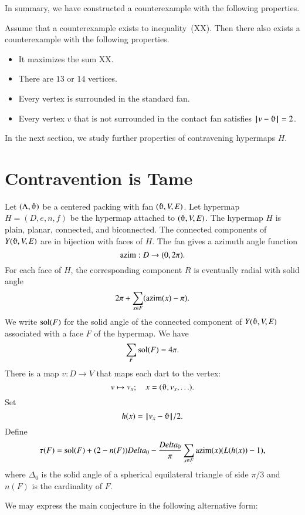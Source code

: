 In summary, we have constructed a counterexample with the following properties.

\begin{lemma} Assume that a counterexample exists to inequality~(XX).  Then there also exists a counterexample with the following properties.
\begin{itemize}
\item It maximizes the sum XX.
\item There are $13$ or $14$ vertices.
\item Every vertex is surrounded in the standard fan.
\item Every vertex $v$ that is not surrounded in the contact
fan satisfies $\norm{v}{\orgn}=2$.
\end{itemize}
\end{lemma}







In the next section, we study further properties of contravening hypermaps $H$.





\section{Contravention is Tame}
    \label{sec:contraproof}

Let $(\Lambda,\orgn)$ be a centered packing with
fan $(\orgn,V,E)$.  Let  hypermap $H=(D,e,n,f)$
be the hypermap attached to $(\orgn,V,E)$.
The hypermap $H$ is plain, planar, connected, and biconnected.
The connected components of $Y(\orgn,V,E)$ are in bijection with
faces of $H$.  
The fan gives a azimuth angle function
$$
{\operatorname{azim}} : D \to (0,2\pi).
$$
For each face of $H$, the corresponding component $R$
is eventually radial with solid
angle
  $$
  2\pi + \sum_{x\in F} ({\operatorname{azim}}(x) -\pi).
  $$
We write $\operatorname{sol}(F)$ for the solid angle of the connected component
of $Y(\orgn,V,E)$ associated with a face $F$ of the hypermap.
We have
    $$\sum_{F} \operatorname{sol}(F) = 4\pi.$$
There is a map $v:D\to V$ that maps each dart to the vertex:
$$
v \mapsto v_x; \quad   x = (\orgn,v_x,\ldots).
$$
Set 
$$h(x) = \norm{v_x}{\orgn}/2.$$
Define
$$\tau(F) = \operatorname{sol}(F) + (2- n(F))Delta_0 - \frac{Delta_0}{\pi}\sum_{x\in F}{\operatorname{azim}}(x) (L(h(x)) - 1),
$$
where $\Delta_0$ is the solid angle of a spherical equilateral triangle of side $\pi/3$ and $n(F)$ is the cardinality of $F$.

We may express the main conjecture in the following alternative form:

